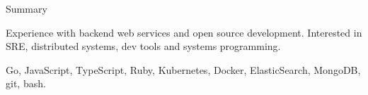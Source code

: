 \documentclass{resume} %
\begin{document}

\begin{rSection}{Summary}
  \begin{rSummarySection}
  {
    \item Experience with backend web services and open source development. Interested in SRE, distributed systems, dev tools and systems programming.
    \item Go, JavaScript, TypeScript, Ruby, Kubernetes, Docker, ElasticSearch, MongoDB, git, bash.
  }
  \end{rSummarySection}
\end{rSection}

\end{document}

